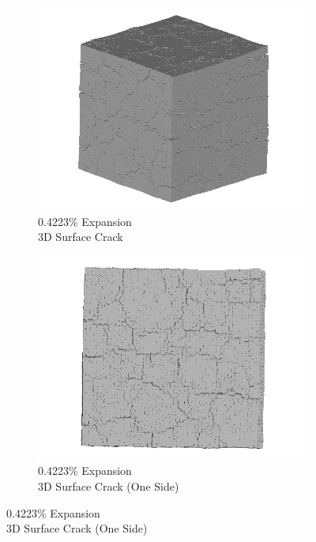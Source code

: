 \begin{figure}[ht!]
    \begin{subfigure}{.5\textwidth}
      \centering
      \includegraphics[width=0.5\linewidth]{Files/exp_3D/ASR/A30P75_3_3d.png}
      \caption{0.4223\% Expansion\\3D Surface Crack}
    \end{subfigure}%
    \begin{subfigure}{.5\textwidth}
      \centering
      \includegraphics[width=0.5\linewidth]{Files/exp_3D/ASR/A30P75_3_3ds.png}
      \caption{0.4223\% Expansion\\3D Surface Crack (One Side)}
    \end{subfigure}%


\end{figure}
